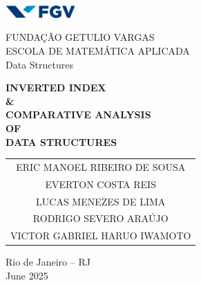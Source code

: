\begin{titlepage}
    \centering 


    \includegraphics[width=0.2\textwidth]{img/fgv.png} 
    
    \vspace{0.3cm} 

    {\Large FUNDAÇÃO GETULIO VARGAS \\}
    {\normalsize ESCOLA DE MATEMÁTICA APLICADA \\}
    {\normalsize Data Structures}

    \vfill 

    {\bfseries\LARGE INVERTED INDEX \\ \vspace{0.2cm} \& \\ \vspace{0.2cm} COMPARATIVE ANALYSIS \\ \vspace{0.3cm} OF \\ \vspace{0.3cm} DATA STRUCTURES}

    \vfill 

    \begin{tabular}{c}
        ERIC MANOEL RIBEIRO DE SOUSA \\
        EVERTON COSTA REIS \\
        LUCAS MENEZES DE LIMA \\
        RODRIGO SEVERO ARAÚJO \\
        VICTOR GABRIEL HARUO IWAMOTO \\
    \end{tabular}

    \vspace{2.5cm} 

    {Rio de Janeiro -- RJ \\} 
    {June 2025}

\end{titlepage}